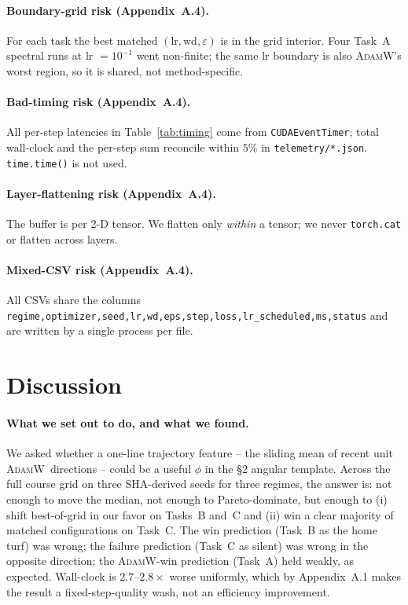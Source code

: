 \documentclass{article}
\newcommand{\Adamw}{\textsc{AdamW}}
\begin{document}
\paragraph{Boundary-grid risk (Appendix~A.4).}
For each task the best matched $(\text{lr},\text{wd},\varepsilon)$
is in the grid interior.  Four Task~A spectral runs at lr $=10^{-1}$
went non-finite; the same lr boundary is also \Adamw's worst region,
so it is shared, not method-specific.

\paragraph{Bad-timing risk (Appendix~A.4).}
All per-step latencies in Table~\ref{tab:timing} come from
\texttt{CUDAEventTimer}; total wall-clock and the per-step sum
reconcile within $5\%$ in \texttt{telemetry/*.json}.
\texttt{time.time()} is not used.

\paragraph{Layer-flattening risk (Appendix~A.4).}
The buffer is per 2-D tensor.  We flatten only \emph{within} a
tensor; we never \texttt{torch.cat} or flatten across layers.

\paragraph{Mixed-CSV risk (Appendix~A.4).}
All CSVs share the columns
\texttt{regime,optimizer,seed,lr,wd,eps,step,loss,lr\_scheduled,ms,status}
and are written by a single process per file.

\section{Discussion}

\paragraph{What we set out to do, and what we found.}
We asked whether a one-line trajectory feature -- the sliding mean
of recent unit \Adamw\ directions -- could be a useful $\phi$ in the
§2 angular template.  Across the full course grid on three
SHA-derived seeds for three regimes, the answer is: not enough to
move the median, not enough to Pareto-dominate, but enough to
(i) shift best-of-grid in our favor on Tasks~B and~C and
(ii) win a clear majority of matched configurations on Task~C.
The win prediction (Task~B as the home turf) was wrong; the failure
prediction (Task~C as silent) was wrong in the opposite direction;
the \Adamw-win prediction (Task~A) held weakly, as expected.
Wall-clock is $2.7$--$2.8\times$ worse uniformly, which by
Appendix~A.1 makes the result a fixed-step-quality wash, not an
efficiency improvement.
\end{document}
